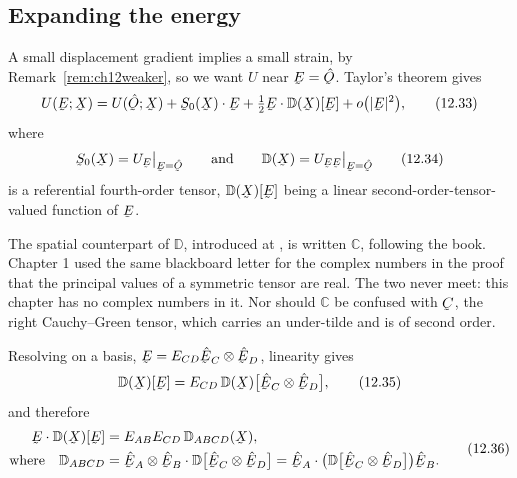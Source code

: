 \subsection*{Expanding the energy}

A small displacement gradient implies a small strain, by
Remark~\ref{rem:ch12weaker}, so we want $U$ near $\bE=\hOb$. Taylor's
theorem gives
\begin{equation}
   U(\bE;\bX)=U(\hOb;\bX)+\bS_{0}(\bX)\cdot\bE
   +\tfrac12\bE\cdot\mathbb{D}(\bX)[\bE]+o\big(|\bE|^{2}\big),
   \tag{12.33}\label{eq:12.33}
\end{equation}
where
\begin{equation}
   \bS_{0}(\bX)=U_{\bE}\big|_{\bE=\hOb}
   \qquad\text{and}\qquad
   \mathbb{D}(\bX)=U_{\bE\bE}\big|_{\bE=\hOb}
   \tag{12.34}\label{eq:12.34}
\end{equation}
is a referential fourth-order tensor, $\mathbb{D}(\bX)[\bE]$ being a
linear second-order-tensor-valued function of $\bE$.

\begin{remark}\label{rem:ch12Cclash}
The spatial counterpart of $\mathbb{D}$, introduced at , is
written $\mathbb{C}$, following the book. Chapter 1 used the same
blackboard letter for the complex numbers in the proof that the
principal values of a symmetric tensor are real. The two never meet:
this chapter has no complex numbers in it. Nor should $\mathbb{C}$ be
confused with $\bC$, the right Cauchy--Green tensor, which carries an
under-tilde and is of second order.
\end{remark}

Resolving on a basis, $\bE=E_{CD}\hbE_{C}\otimes\hbE_{D}$, linearity
gives
\begin{equation}
   \mathbb{D}(\bX)[\bE]
   =E_{CD}\,\mathbb{D}(\bX)\big[\hbE_{C}\otimes\hbE_{D}\big],
   \tag{12.35}\label{eq:12.35}
\end{equation}
and therefore
\begin{equation}
\begin{aligned}
   \bE\cdot\mathbb{D}(\bX)[\bE]&=E_{AB}E_{CD}\,\mathbb{D}_{ABCD}(\bX),\\
   \text{where}\quad \mathbb{D}_{ABCD}
   &=\hbE_{A}\otimes\hbE_{B}\cdot
     \mathbb{D}\big[\hbE_{C}\otimes\hbE_{D}\big]
   =\hbE_{A}\cdot\big(\mathbb{D}\big[\hbE_{C}\otimes\hbE_{D}\big]\big)
     \hbE_{B}.
\end{aligned}
   \tag{12.36}\label{eq:12.36}
\end{equation}

